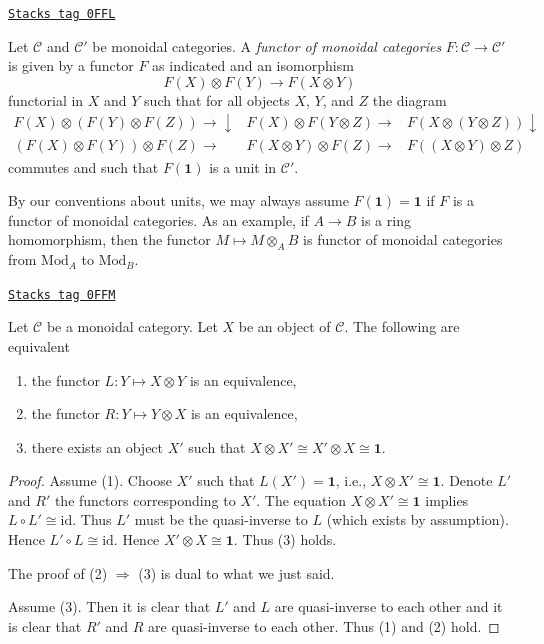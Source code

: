 \begin{definition}
\label{categories-definition-functor-monoidal-categories}
\href{https://stacks.math.columbia.edu/tag/0FFL}{\texttt{Stacks tag 0FFL}}

Let $\mathcal{C}$ and $\mathcal{C}'$ be monoidal categories.
A {\it functor of monoidal categories} $F : \mathcal{C} \to \mathcal{C}'$
is given by a functor $F$ as indicated and an isomorphism
$$
F(X) \otimes F(Y) \to F(X \otimes Y)
$$
functorial in $X$ and $Y$
such that for all objects $X$, $Y$, and $Z$ the diagram
$$
\begin{array}{ccc}F(X) \otimes (F(Y) \otimes F(Z)) \longrightarrow\downarrow & F(X) \otimes F(Y \otimes Z) \longrightarrow & F(X \otimes (Y \otimes Z)) \downarrow \\ (F(X) \otimes F(Y)) \otimes F(Z) \longrightarrow & F(X \otimes Y) \otimes F(Z) \longrightarrow & F((X \otimes Y) \otimes Z)\end{array}
$$
commutes and such that $F(\mathbf{1})$ is a unit in $\mathcal{C}'$.
\end{definition}

By our conventions about units, we may always assume
$F(\mathbf{1}) = \mathbf{1}$ if $F$ is a functor of monoidal categories.
As an example, if $A \to B$ is a ring homomorphism, then
the functor $M \mapsto M \otimes_A B$ is functor of monoidal
categories from $\text{Mod}_A$ to $\text{Mod}_B$.

\begin{lemma}[Invertible]
\label{categories-lemma-invertible}
\href{https://stacks.math.columbia.edu/tag/0FFM}{\texttt{Stacks tag 0FFM}}

Let $\mathcal{C}$ be a monoidal category. Let $X$ be an object of
$\mathcal{C}$. The following are equivalent
\begin{enumerate}
\item the functor $L : Y \mapsto X \otimes Y$ is an equivalence,
\item the functor $R : Y \mapsto Y \otimes X$ is an equivalence,
\item there exists an object $X'$ such that
$X \otimes X' \cong X' \otimes X \cong \mathbf{1}$.
\end{enumerate}
\end{lemma}

\begin{proof}
Assume (1). Choose $X'$ such that $L(X') = \mathbf{1}$, i.e.,
$X \otimes X' \cong \mathbf{1}$. Denote $L'$ and $R'$ the functors
corresponding to $X'$. The equation $X \otimes X' \cong \mathbf{1}$
implies $L \circ L' \cong \text{id}$. Thus $L'$ must be the quasi-inverse
to $L$ (which exists by assumption). Hence $L' \circ L \cong \text{id}$.
Hence $X' \otimes X \cong \mathbf{1}$. Thus (3) holds.

\medskip\noindent
The proof of (2) $\Rightarrow$ (3) is dual to what we just said.

\medskip\noindent
Assume (3). Then it is clear that $L'$ and $L$ are quasi-inverse
to each other and it is clear that $R'$ and $R$ are quasi-inverse
to each other. Thus (1) and (2) hold.
\end{proof}

